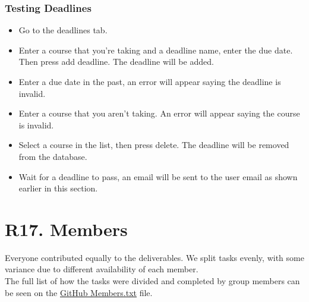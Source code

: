 \documentclass[12pt, a4paper]{article}
\begin{document}
\subsubsection*{Testing Deadlines}
\begin{itemize}
    \item Go to the deadlines tab.
    \item Enter a course that you're taking and a deadline name, enter the due date. Then press add deadline. The deadline will be added.
    \item Enter a due date in the past, an error will appear saying the deadline is invalid.
    \item Enter a course that you aren't taking. An error will appear saying the course is invalid.
    \item Select a course in the list, then press delete. The deadline will be removed from the database.
    \item Wait for a deadline to pass, an email will be sent to the user email as shown earlier in this section.
\end{itemize}
\section*{R17. Members}
Everyone contributed equally to the deliverables. We split tasks evenly, with some variance due to different availability of each member.\\

The full list of how the tasks were divided and completed by group members can be seen on the \underline{\href{https://github.com/Kggupta/DegreeMap/blob/main/Members.txt}{GitHub Members.txt}} file.
\end{document}
